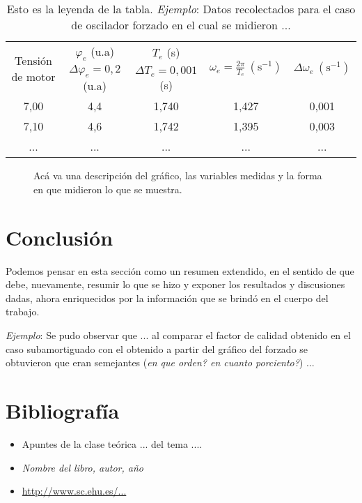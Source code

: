 \documentclass[12pt,a4paper]{article}
\begin{document}
\begin{table}[ht]
    \centering
    \begin{tabular}{|c|c|c|c|c|} 
    \hline
    \multirow{2}{1.7cm}{Tensión de motor} & $\varphi_e$ (u.a) & $T_e$ (s) & \multirow{2}{2.55cm}{$\omega_e=\frac{2\pi}{T_e} \ (\mathrm{s}^{-1})$ } & \multirow{2}{1.75cm}{$\Delta \omega_e \ (\mathrm{s}^{-1})$}\\ 
     & $ \Delta\varphi_e=0,2$ (u.a) & $\Delta T_e=0,001$ (s) &  & \\  \hline
         7,00  &   4,4  &   1,740 &   1,427  &   0,001 \\
         7,10  &   4,6  &   1,742 &   1,395  &   0,003 \\ 
        ... &   ...  &   ... &   ...  &   ...  \\ \hline
    \end{tabular}
    \caption{Esto es la leyenda de la tabla. \textit{Ejemplo}: Datos recolectados para el caso de oscilador forzado en el cual se midieron ...}
    \label{tabla2}
\end{table}


\begin{figure}[ht]
    \centering
    \caption{Acá va una descripción del gráfico, las variables medidas y la forma en que midieron lo que se muestra. }
    \label{fig2}
\end{figure}


\section{Conclusión}

Podemos pensar en esta sección como un resumen extendido, en el sentido de que debe, nuevamente, resumir lo que se hizo y exponer los resultados y discusiones dadas, ahora enriquecidos por la información que se brindó en el cuerpo del trabajo.

\textit{Ejemplo}: Se pudo observar que ... al comparar el factor de calidad obtenido en el caso subamortiguado con el obtenido
a partir del gráfico del forzado se obtuvieron que eran semejantes (\textit{en que orden? en cuanto porciento?}) ...


\section{Bibliografía}
\begin{itemize}
    \item Apuntes de la clase teórica ... del tema ....
    \item \textit{Nombre del libro, autor, año}
    \item \hyperlink{http://www.sc.ehu.es/...}{http://www.sc.ehu.es/...}
\end{itemize}
\end{document}
